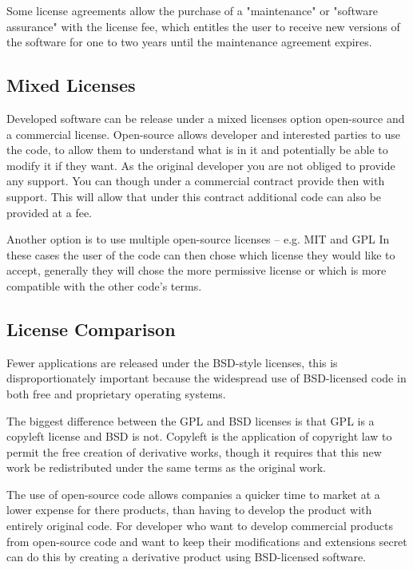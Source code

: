 \documentclass[12pt, onecolumn]{witseiepaper}
\begin{document}
Some license agreements allow the purchase of a "maintenance" or "software assurance" with the license fee, which entitles the user to receive new versions of the software for one to two years until the maintenance agreement expires.

\subsection{Mixed Licenses}

Developed software can be release under a mixed licenses option open-source and a commercial license.  Open-source allows developer and interested parties to use the code, to allow them to understand what is in it and potentially be able to modify it if they want. As the original developer you are not obliged to provide any support.  You can though under a commercial contract provide then with support.  This will allow that under this contract additional code can also be provided at a fee.

Another option is to use multiple open-source licenses -- e.g. MIT and GPL
In these cases the user of the code can then chose which license they would like to accept, generally they will chose the more permissive license or which is more compatible with the other code's terms. 

\subsection{License Comparison}

Fewer applications are released under the BSD-style licenses,  this is disproportionately important because the widespread use of BSD-licensed code in both free and proprietary operating systems.

The biggest difference between the GPL and BSD licenses is that GPL is a copyleft license and BSD is not. Copyleft is the application of copyright law to permit the free creation of derivative works, though it requires that this new work be redistributed under the same terms as the original work.

The use of open-source code allows companies a quicker time to market at a lower expense for there products, than having to develop the product with entirely original code.  For developer who want to develop commercial products from open-source code and want to keep their modifications and extensions secret can do this by creating a  derivative product using BSD-licensed software.


\end{document}
